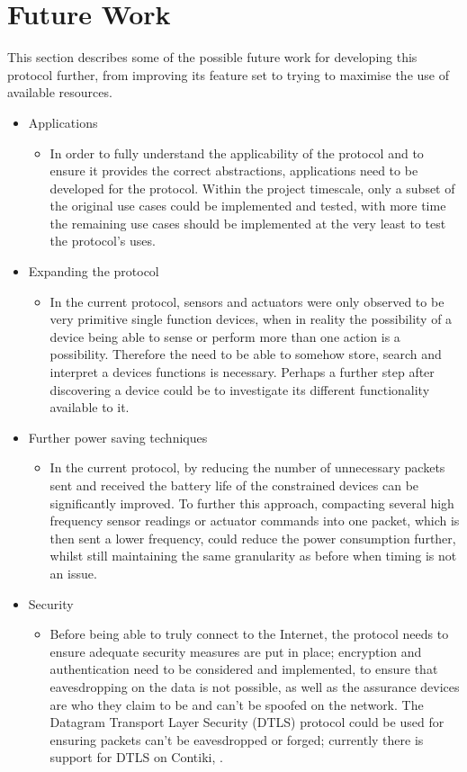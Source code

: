 \section{Future Work}
This section describes some of the possible future work for developing this protocol further, from improving its feature set to trying to maximise the use of available resources.
\begin{itemize}
	\item Applications
	\begin{itemize}
		\item In order to fully understand the applicability of the protocol and to ensure it provides the correct abstractions, applications need to be developed for the protocol. Within the project timescale, only a subset of the original use cases could be implemented and tested, with more time the remaining use cases should be implemented at the very least to test the protocol's uses.
	\end{itemize}
	\item Expanding the protocol
	\begin{itemize}
		\item In the current protocol, sensors and actuators were only observed to be very primitive single function devices, when in reality the possibility of a device being able to sense or perform more than one action is a possibility. Therefore the need to be able to somehow store, search and interpret a devices functions is necessary. Perhaps a further step after discovering a device could be to investigate its different functionality available to it.
	\end{itemize}
	\item Further power saving techniques
	\begin{itemize}
		\item In the current protocol, by reducing the number of unnecessary packets sent and received the battery life of the constrained devices can be significantly improved. To further this approach, compacting several high frequency sensor readings or actuator commands into one packet, which is then sent a lower frequency, could reduce the power consumption further, whilst still maintaining the same granularity as before when timing is not an issue.
	\end{itemize}
	\item Security
	\begin{itemize}
		\item Before being able to truly connect to the Internet, the protocol needs to ensure adequate security measures are put in place; encryption and authentication need to be considered and implemented, to ensure that eavesdropping on the data is not possible, as well as the assurance devices are who they claim to be and can't be spoofed on the network. The Datagram Transport Layer Security (DTLS) protocol could be used for ensuring packets can't be eavesdropped or forged; currently there is support for DTLS on Contiki, \cite{DTLSContiki} .

\end{itemize}
\end{itemize}
